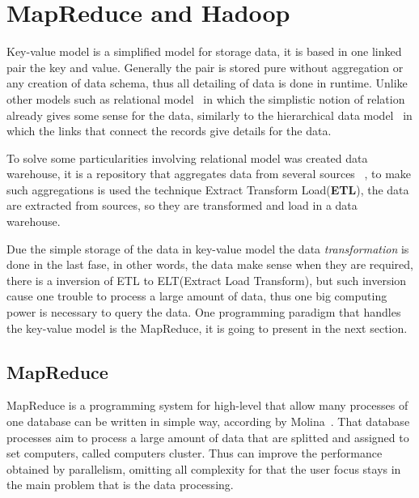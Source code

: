 \chapter{MapReduce and Hadoop} %
\label{cha:background}


Key-value model is a simplified model for storage data, it is based in one linked
pair the key and value. Generally the pair is stored pure without aggregation or
any creation of data schema, thus all detailing of data is done in runtime. Unlike
other models such as relational model~\cite{codd:1970} in which the simplistic notion
of relation already gives some sense for the data, similarly to the hierarchical
data model~\cite{silber:2005} in which the links that connect the records give
details for the data.

To solve some particularities involving relational model was created data warehouse,
it is a repository that aggregates data from several sources ~\cite{silber:2005},
to make such aggregations is used the technique Extract Transform Load(\textbf{ETL}),
the data are extracted from sources, so they are transformed and load in a data
warehouse.

Due the simple storage of the data in key-value model the data \textit{transformation}
is done in the last fase, in other words, the data make sense when they are required,
there is a inversion of ETL to ELT(Extract Load Transform), but such inversion
cause one trouble to process a large amount of data, thus one big computing
power is necessary to query the data. One programming paradigm that handles the
key-value model is the MapReduce, it is going to present in the next section.

\section{MapReduce}\label{section:mapreduce}
MapReduce is a programming system for high-level that allow many processes of one
database can be written in simple way, according by Molina~\cite{molina:2009}.
That database processes aim to process a large amount of data that are splitted
and assigned to set computers, called computers cluster. Thus can improve the
performance obtained by parallelism, omitting all complexity for that the user
focus stays in the main problem that is the data processing.

